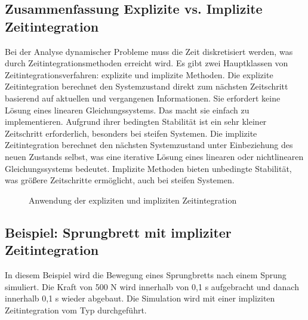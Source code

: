 \documentclass[letterpaper,10pt,german]{jupyterBook}
\let\sphinxpxdimen\pdfpxdimen\else\newdimen\sphinxpxdimen
\begin{document}
\subsection{Zusammenfassung Explizite vs. Implizite Zeitintegration}
\label{\detokenize{chapters/chapter6/TransienteDynamik:zusammenfassung-explizite-vs-implizite-zeitintegration}}
\sphinxAtStartPar
Bei der Analyse dynamischer Probleme muss die Zeit diskretisiert werden, was durch Zeitintegrationsmethoden erreicht wird. Es gibt zwei Hauptklassen von Zeitintegrationsverfahren: explizite und implizite Methoden. Die explizite Zeitintegration berechnet den Systemzustand direkt zum nächsten Zeitschritt basierend auf aktuellen und vergangenen Informationen.
Sie erfordert keine Lösung eines linearen Gleichungssystems. Das macht sie einfach zu implementieren. Aufgrund ihrer bedingten Stabilität ist ein sehr kleiner Zeitschritt erforderlich, besonders bei steifen Systemen. Die implizite Zeitintegration berechnet den nächsten Systemzustand unter Einbeziehung des neuen Zustands selbst, was eine iterative Lösung eines linearen oder nichtlinearen Gleichungssystems bedeutet. Implizite Methoden bieten unbedingte Stabilität, was größere Zeitschritte ermöglicht, auch bei steifen Systemen.

\begin{figure}[htbp]
\centering
\capstart

\noindent\sphinxincludegraphics[width=700\sphinxpxdimen]{{Ansys_implicit_Explicit}.png}
\caption{Anwendung der expliziten und impliziten Zeitintegration }\label{\detokenize{chapters/chapter6/TransienteDynamik:anwendung-explizit-implizit}}\end{figure}


\subsection{Beispiel: Sprungbrett mit impliziter Zeitintegration}
\label{\detokenize{chapters/chapter6/TransienteDynamik:beispiel-sprungbrett-mit-impliziter-zeitintegration}}
\sphinxAtStartPar
In diesem Beispiel wird die Bewegung eines Sprungbretts nach einem Sprung simuliert. Die Kraft von 500 N wird innerhalb von 0,1 s aufgebracht und danach innerhalb 0,1 s wieder abgebaut. Die Simulation wird mit einer impliziten Zeitintegration vom \sphinxhyphen{}Typ durchgeführt.
\end{document}
